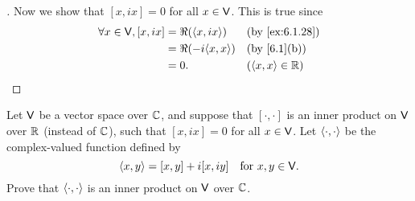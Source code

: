 \begin{proof}[]
  Now we show that \([x, ix] = 0\) for all \(x \in \mathsf{V}\).
  This is true since
  \begin{align*}
    \forall x \in \V, [x, ix] & = \Re(\inn{x, ix})   &  & \by{ex:6.1.28}      \\
                              & = \Re(-i \inn{x, x}) &  & \by{6.1}[b]         \\
                              & = 0.                 &  & (\inn{x, x} \in \R)
  \end{align*}
\end{proof}

\begin{ex}\label{ex:6.1.29}
  Let \(\mathsf{V}\) be a vector space over \(\mathbb{C}\), and suppose that \([\cdot, \cdot]\) is an inner product on \(\mathsf{V}\) over \(\mathbb{R}\) (instead of \(\mathbb{C}\)), such that \([x, ix] = 0\) for all \(x \in \mathsf{V}\).
  Let \(\left\langle\cdot, \cdot\right\rangle\) be the complex-valued function defined by
  \[
    \left\langle x, y\right\rangle = [x, y] + i[x, iy] \quad \text{for } x, y \in \mathsf{V}.
  \]
  Prove that \(\left\langle\cdot, \cdot\right\rangle\) is an inner product on \(\mathsf{V}\) over \(\mathbb{C}\).
\end{ex}

